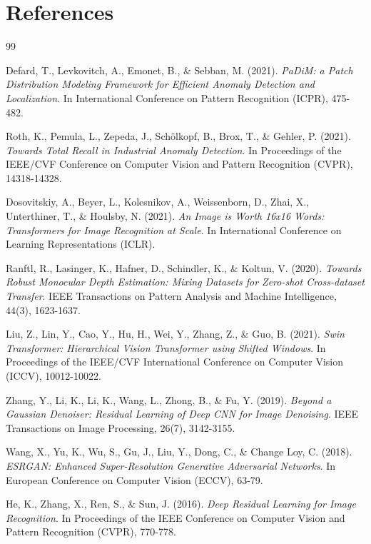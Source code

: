 \documentclass[12pt]{article}
\begin{document}
\clearpage
\section{References}
\begin{thebibliography}{99}

Defard, T., Levkovitch, A., Emonet, B., \& Sebban, M. (2021).
\textit{PaDiM: a Patch Distribution Modeling Framework for Efficient Anomaly Detection and Localization}.
In International Conference on Pattern Recognition (ICPR), 475-482.

Roth, K., Pemula, L., Zepeda, J., Schölkopf, B., Brox, T., \& Gehler, P. (2021).
\textit{Towards Total Recall in Industrial Anomaly Detection}.
In Proceedings of the IEEE/CVF Conference on Computer Vision and Pattern Recognition (CVPR), 14318-14328.

Dosovitskiy, A., Beyer, L., Kolesnikov, A., Weissenborn, D., Zhai, X., Unterthiner, T., \& Houlsby, N. (2021).
\textit{An Image is Worth 16x16 Words: Transformers for Image Recognition at Scale}.
In International Conference on Learning Representations (ICLR).

Ranftl, R., Lasinger, K., Hafner, D., Schindler, K., \& Koltun, V. (2020).
\textit{Towards Robust Monocular Depth Estimation: Mixing Datasets for Zero-shot Cross-dataset Transfer}.
IEEE Transactions on Pattern Analysis and Machine Intelligence, 44(3), 1623-1637.

Liu, Z., Lin, Y., Cao, Y., Hu, H., Wei, Y., Zhang, Z., \& Guo, B. (2021).
\textit{Swin Transformer: Hierarchical Vision Transformer using Shifted Windows}.
In Proceedings of the IEEE/CVF International Conference on Computer Vision (ICCV), 10012-10022.

Zhang, Y., Li, K., Li, K., Wang, L., Zhong, B., \& Fu, Y. (2019).
\textit{Beyond a Gaussian Denoiser: Residual Learning of Deep CNN for Image Denoising}.
IEEE Transactions on Image Processing, 26(7), 3142-3155.

Wang, X., Yu, K., Wu, S., Gu, J., Liu, Y., Dong, C., \& Change Loy, C. (2018).
\textit{ESRGAN: Enhanced Super-Resolution Generative Adversarial Networks}.
In European Conference on Computer Vision (ECCV), 63-79.

He, K., Zhang, X., Ren, S., \& Sun, J. (2016).
\textit{Deep Residual Learning for Image Recognition}.
In Proceedings of the IEEE Conference on Computer Vision and Pattern Recognition (CVPR), 770-778.


\end{thebibliography}
\end{document}
